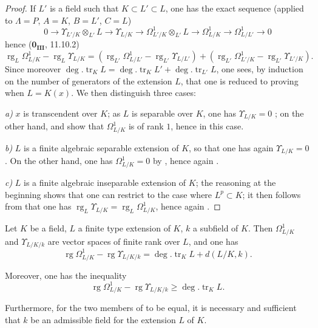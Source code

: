 \begin{proof}
If $L'$ is a field such that $K\subset L'\subset L$, one has the exact sequence  (applied to $\Lambda=P$, $A=K$, $B=L'$, $C=L$)
\[
  0\to\Upsilon_{L'/K}\otimes_{L'} L\to\Upsilon_{L/K}\to\Omega^1_{L'/K}\otimes_{L'} L\to\Omega^1_{L/K}\to\Omega^1_{L/L'}\to 0
\]
hence ($\mathbf{0_{III}}$, 11.10.2)
\[
  \operatorname{rg}_L\Omega^1_{L/K}-\operatorname{rg}_L\Upsilon_{L/K}=(\operatorname{rg}_{L'}\Omega^1_{L/L'}-\operatorname{rg}_{L'}\Upsilon_{L/L'})+(\operatorname{rg}_{L'}\Omega^1_{L'/K}-\operatorname{rg}_{L'}\Upsilon_{L'/K}).
\]
Since moreover $\deg.\operatorname{tr}_K L=\deg.\operatorname{tr}_K L'+\deg.\operatorname{tr}_{L'} L$, one sees, by induction on the number of generators of the extension $L$, that one is reduced to proving  when $L=K(x)$.
We then distinguish three cases:

\emph{a)} $x$ is transcendent over $K$; as $L$ is separable over $K$, one has $\Upsilon_{L/K}=0$ ; on the other hand,  and  show that $\Omega^1_{L/K}$ is of rank $1$, hence  in this case.

\emph{b)} $L$ is a finite algebraic separable extension of $K$, so that one has again $\Upsilon_{L/K}=0$ .
On the other hand, one has $\Omega^1_{L/K}=0$ by , hence again .

\emph{c)} $L$ is a finite algebraic inseparable extension of $K$; the reasoning at the beginning shows that one can restrict to the case where $L^p\subset K$; it then follows from  that one has $\operatorname{rg}_L\Upsilon_{L/K}=\operatorname{rg}_L\Omega^1_{L/K}$, hence again .
\end{proof}

\begin{corollary}[21.7.2]
\label{0.21.7.2}
Let $K$ be a field, $L$ a finite type extension of $K$, $k$ a subfield of $K$.
Then $\Omega^1_{L/K}$ and $\Upsilon_{L/K/k}$ are vector spaces of finite rank over $L$, and one has
\begin{equation}
\tag{21.7.2.1}
  \label{0.21.7.2.1}
  \operatorname{rg}\Omega^1_{L/K}-\operatorname{rg}\Upsilon_{L/K/k}=\deg.\operatorname{tr}_K L+d(L/K,k).
\end{equation}

Moreover, one has the inequality
\begin{equation}
\tag{21.7.2.2}
  \label{0.21.7.2.2}
  \operatorname{rg}\Omega^1_{L/K}-\operatorname{rg}\Upsilon_{L/K/k}\geqslant\deg.\operatorname{tr}_K L.
\end{equation}

Furthermore, for the two members of  to be equal, it is necessary and sufficient that $k$ be an admissible field for the extension $L$ of $K$.
\end{corollary}

